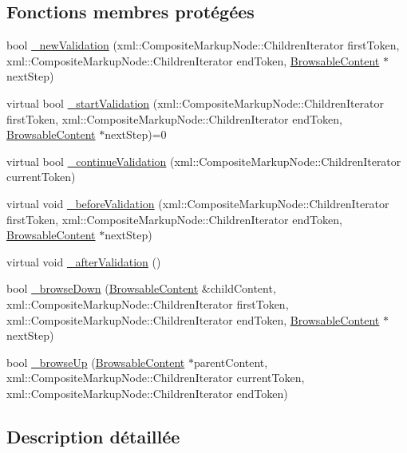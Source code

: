 \subsection*{Fonctions membres protégées}
\begin{DoxyCompactItemize}
\item 
bool \hyperlink{classdtd_1_1_browsable_content_a54a43ef27f874748f99b8ab71c23e2dc}{\_\-newValidation} (xml::CompositeMarkupNode::ChildrenIterator firstToken, xml::CompositeMarkupNode::ChildrenIterator endToken, \hyperlink{classdtd_1_1_browsable_content}{BrowsableContent} $\ast$nextStep)
\item 
virtual bool \hyperlink{classdtd_1_1_browsable_content_a67ab5a7329d94e363796ae2d17617246}{\_\-startValidation} (xml::CompositeMarkupNode::ChildrenIterator firstToken, xml::CompositeMarkupNode::ChildrenIterator endToken, \hyperlink{classdtd_1_1_browsable_content}{BrowsableContent} $\ast$nextStep)=0
\item 
virtual bool \hyperlink{classdtd_1_1_browsable_content_a6398e5990648e2af3fd775592b0d62ea}{\_\-continueValidation} (xml::CompositeMarkupNode::ChildrenIterator currentToken)
\item 
virtual void \hyperlink{classdtd_1_1_browsable_content_ae9e55da18cc09557fc7896a7ccac2ee1}{\_\-beforeValidation} (xml::CompositeMarkupNode::ChildrenIterator firstToken, xml::CompositeMarkupNode::ChildrenIterator endToken, \hyperlink{classdtd_1_1_browsable_content}{BrowsableContent} $\ast$nextStep)
\item 
virtual void \hyperlink{classdtd_1_1_browsable_content_a378fc620af75eb9bad9f37c663e3838d}{\_\-afterValidation} ()
\item 
bool \hyperlink{classdtd_1_1_browsable_content_aea818259a913cb7359d902ee121c4e87}{\_\-browseDown} (\hyperlink{classdtd_1_1_browsable_content}{BrowsableContent} \&childContent, xml::CompositeMarkupNode::ChildrenIterator firstToken, xml::CompositeMarkupNode::ChildrenIterator endToken, \hyperlink{classdtd_1_1_browsable_content}{BrowsableContent} $\ast$nextStep)
\item 
bool \hyperlink{classdtd_1_1_browsable_content_a267660fa668e638d6487a875ffd958b0}{\_\-browseUp} (\hyperlink{classdtd_1_1_browsable_content}{BrowsableContent} $\ast$parentContent, xml::CompositeMarkupNode::ChildrenIterator currentToken, xml::CompositeMarkupNode::ChildrenIterator endToken)
\end{DoxyCompactItemize}


\subsection{Description détaillée}


